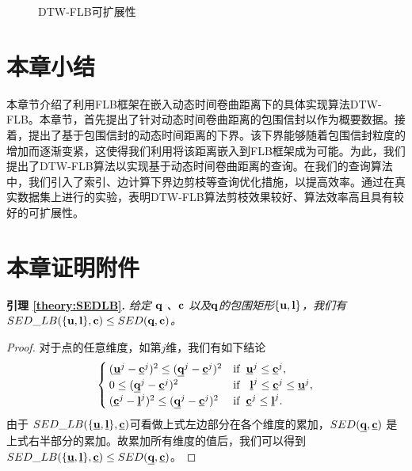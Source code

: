    \begin{figure} [t]
   	\centering
   	\caption{DTW-FLB可扩展性}
   	\label{fig:HpaaScalability}
   \end{figure}
   
  
  \section{本章小结}\label{sec-c5-conclusion}
本章节介绍了利用FLB框架在嵌入动态时间卷曲距离下的具体实现算法DTW-FLB。本章节，首先提出了针对动态时间卷曲距离的包围信封以作为概要数据。接着，提出了基于包围信封的动态时间距离的下界。该下界能够随着包围信封粒度的增加而逐渐变紧，这使得我们利用将该距离嵌入到FLB框架成为可能。为此，我们提出了DTW-FLB算法以实现基于动态时间卷曲距离的查询。在我们的查询算法中，我们引入了索引、边计算下界边剪枝等查询优化措施，以提高效率。通过在真实数据集上进行的实验，表明DTW-FLB算法剪枝效果较好、算法效率高且具有较好的可扩展性。


\section*{本章证明附件}\label{sec-c5-Appendix}
\textbf{引理 \ref{theory:SEDLB}. }{\em 给定 $\textbf{q}$ 、$\textbf{c}$ 以及$\textbf{q}$的包围矩形$\{\textbf{u}, \textbf{l}\}$，我们有
	$SED\_LB(\{{\textbf{u}},\textbf{l} \},\textbf{c})\le SED(\textbf{q},\textbf{c})$。}

\begin{proof}
	对于点的任意维度，如第$j$维，我们有如下结论
	\begin{equation}
	\begin{cases}
	({\emph{{\textbf{u}}}}^{j}- {\emph{{\textbf{c}}}}^{j})^2 \le  ({\emph{{\textbf{q}}}}^{j}- {\emph{{\textbf{c}}}}^{j})^2     & {\rm if}   \,\,\,    \emph{{\textbf{u}}}^{j} \le {\emph{{\textbf{c}}}}^{j},\\
	0 \le  ({\emph{{\textbf{q}}}}^{j}- {\emph{{\textbf{c}}}}^{j})^2   & {\rm if}  \,\,\,   \  \emph{{\textbf{l}}}^{j} \le  {\emph{{\textbf{c}}}}^{j} \le \emph{{\textbf{u}}}^{j},\\
	({\emph{{\textbf{c}}}}^{j} -{\emph{{\textbf{l}}}}^{j})^2 \le  ({\emph{{\textbf{q}}}}^{j}- {\emph{{\textbf{c}}}}^{j})^2  &{\rm if}  \,\,\,    {\emph{{\textbf{c}}}}^{j} \le \emph{{\textbf{l}}}^{j}.
	\end{cases}
	\end{equation}
	由于	$SED\_LB(\{{\emph{{\textbf{u}}}},\emph{{\textbf{l}}} \},\emph{{\textbf{c}}})$可看做上式左边部分在各个维度的累加，$SED(\emph{{\textbf{q}}},\emph{{\textbf{c}}})$ 是上式右半部分的累加。故累加所有维度的值后，我们可以得到$SED\_LB(\{{\emph{{\textbf{u}}}},\emph{{\textbf{l}}} \},\emph{{\textbf{c}}})\le SED(\emph{{\textbf{q}}},\emph{{\textbf{c}}})$。
\end{proof}


